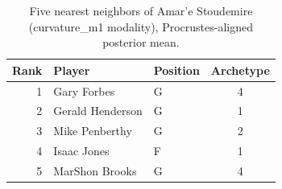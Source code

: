\begin{table}[htbp]
  \centering\small
  \begin{tabular}{rllc}
    \toprule
    Rank & Player & Position & Archetype \\
    \midrule
    1 & Gary Forbes & G & 4 \\
    2 & Gerald Henderson & G & 1 \\
    3 & Mike Penberthy & G & 2 \\
    4 & Isaac Jones & F & 1 \\
    5 & MarShon Brooks & G & 4 \\
    \bottomrule
  \end{tabular}
  \caption{Five nearest neighbors of Amar'e Stoudemire (curvature_m1 modality), Procrustes-aligned posterior mean.}
  \label{tab:Amar_e_Stoudemire_neighbors_curvature_m1}
\end{table}

